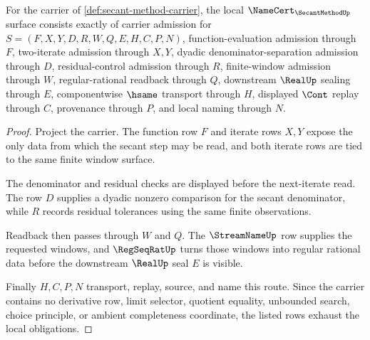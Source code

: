 \begin{theorem}
\label{thm:secant-method-namecert-obligations}
For the carrier of \autoref{def:secant-method-carrier}, the local $\NameCert_{\SecantMethodUp}$ surface consists exactly of carrier admission for $S=(F,X,Y,D,R,W,Q,E,H,C,P,N)$, function-evaluation admission through $F$, two-iterate admission through $X,Y$, dyadic denominator-separation admission through $D$, residual-control admission through $R$, finite-window admission through $W$, regular-rational readback through $Q$, downstream $\RealUp$ sealing through $E$, componentwise $\hsame$ transport through $H$, displayed $\Cont$ replay through $C$, provenance through $P$, and local naming through $N$.
\end{theorem}
\begin{proof}
Project the carrier. The function row $F$ and iterate rows $X,Y$ expose the only data from which the secant step may be read, and both iterate rows are tied to the same finite window surface.

The denominator and residual checks are displayed before the next-iterate read. The row $D$ supplies a dyadic nonzero comparison for the secant denominator, while $R$ records residual tolerances using the same finite observations.

Readback then passes through $W$ and $Q$. The $\StreamNameUp$ row supplies the requested windows, and $\RegSeqRatUp$ turns those windows into regular rational data before the downstream $\RealUp$ seal $E$ is visible.

Finally $H,C,P,N$ transport, replay, source, and name this route. Since the carrier contains no derivative row, limit selector, quotient equality, unbounded search, choice principle, or ambient completeness coordinate, the listed rows exhaust the local obligations.
\end{proof}

